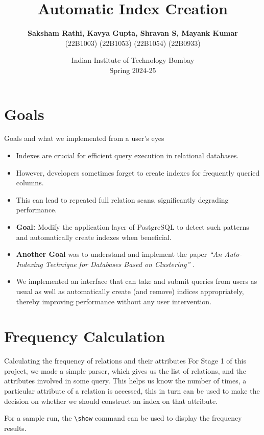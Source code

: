 \documentclass[Serif, 10pt, brown]{beamer}
\title[{DBIS}]{\sc Automatic Index Creation}
\author[\ul{Authors}]{{\bf { Saksham Rathi, Kavya Gupta, Shravan S, Mayank Kumar}}\\ {\footnotesize \hspace{0cm} (22B1003) \hspace{1cm} (22B1053) \hspace{0.5cm} (22B1054) \hspace{0.5cm} (22B0933)}}
\institute[UTD]{\sc\small CS349: DataBase and Information Systems\\ Under Prof. Sudarshan and Prof. Suraj}
\date[UCI]{Indian Institute of Technology Bombay \\ Spring 2024-25}
\theoremstyle{example}
\theoremstyle{plain}
\begin{document}
\frame{\titlepage}
%
%



\section{Goals}
\begin{frame}{Goals and what we implemented from a user's eyes}
	\begin{itemize}
		\item Indexes are crucial for efficient query execution in relational databases.
		\item However, developers sometimes forget to create indexes for frequently queried columns.
		\item This can lead to repeated full relation scans, significantly degrading performance.
		\item {\bf Goal:} Modify the application layer of PostgreSQL to detect such patterns and automatically create indexes when beneficial.
		\item {\bf Another Goal} was to understand and implement the paper \textit{``An Auto-Indexing Technique for Databases Based on Clustering''} \cite{1333569}.
		\item We implemented an interface that can take and submit queries from users as usual as well as automatically create (and remove) indices appropriately, thereby improving performance without any user intervention.
	\end{itemize}
\end{frame}

\section{Frequency Calculation}
\begin{frame}{Calculating the frequency of relations and their attributes}
For Stage 1 of this project, we made a simple parser, which gives us the list of relations, and the attributes involved in some query. This helps us know the number of times, a particular attribute of a relation is accessed, this in turn can be used to make the decision on whether we should construct an index on that attribute.

For a sample run, the \texttt{\textbackslash show} command can be used to display the frequency results.
\end{frame}
\end{document}
